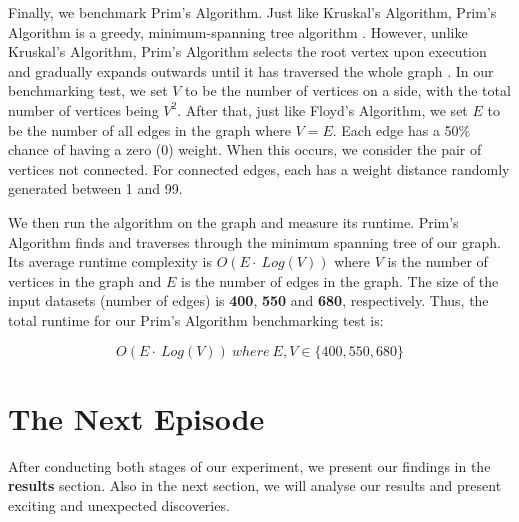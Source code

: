 Finally, we benchmark Prim's Algorithm. Just like Kruskal's Algorithm, Prim's Algorithm is a greedy, minimum-spanning tree algorithm \cite{exp62}. However, unlike Kruskal's Algorithm, Prim's Algorithm selects the root vertex upon execution and gradually expands outwards until it has traversed the whole graph \cite{exp63}. In our benchmarking test, we set \(V\) to be the number of vertices on a side, with the total number of vertices being \(V^2\). After that, just like Floyd's Algorithm, we set \(E\) to be the number of all edges in the graph where \(V = E\). Each edge has a 50\% chance of having a zero (0) weight. When this occurs, we consider the pair of vertices not connected. For connected edges, each has a weight distance randomly generated between 1 and 99.

We then run the algorithm on the graph and measure its runtime. Prim's Algorithm finds and traverses through the minimum spanning tree of our graph. Its average runtime complexity is \(O(E\cdot\ Log(V))\) where \(V\) is the number of vertices in the graph and \(E\) is the number of edges in the graph. The size of the input datasets (number of edges) is \textbf{400}, \textbf{550} and \textbf{680}, respectively. Thus, the total runtime for our Prim's Algorithm benchmarking test is:

\[ O(E\cdot\ Log(V))\ where\ E, V \in \{400, 550, 680\} \]

\bigskip
\section{The Next Episode}

After conducting both stages of our experiment, we present our findings in the \textbf{results} section. Also in the next section, we will analyse our results and present exciting and unexpected discoveries.